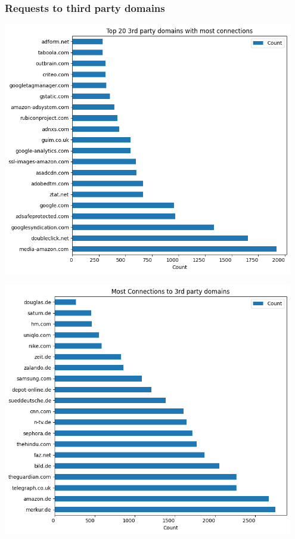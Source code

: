 \subsubsection{Requests to third party domains}
\includegraphics[width=0.95\textwidth]{./assets/top20thirdpartydomains.png}

\includegraphics[width=0.95\textwidth]{./assets/mostConnectionsToThirdPartyDomains.png}

